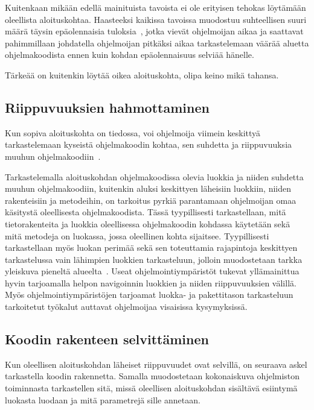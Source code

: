 \documentclass[finnish]{tktltiki2}
\theoremstyle{definition}
\theoremstyle{remark}
\begin{document}
Kuitenkaan mikään edellä mainituista tavoista ei ole erityisen tehokas löytämään oleellista aloituskohtaa. Haasteeksi kaikissa tavoissa muodostuu suhteellisen suuri määrä täysin epäolennaisia tuloksia~\cite{eliciting-design-requirements-for-maintenance-oriented-ides}, jotka vievät ohjelmoijan aikaa ja saattavat pahimmillaan johdatella ohjelmoijan pitkäksi aikaa tarkastelemaan väärää aluetta ohjelmakoodista ennen kuin kohdan epäolennaisuus selviää hänelle.

Tärkeää on kuitenkin löytää oikea aloituskohta, olipa keino mikä tahansa.


\subsection{Riippuvuuksien hahmottaminen}
Kun sopiva aloituskohta on tiedossa, voi ohjelmoija viimein keskittyä tarkastelemaan kyseistä ohjelmakoodin kohtaa, sen suhdetta ja riippuvuuksia muuhun ohjelmakoodiin~\cite{questions-during-software-evolution-tasks}.

Tarkastelemalla aloituskohdan ohjelmakoodissa olevia luokkia ja niiden suhdetta muuhun ohjelmakoodiin, kuitenkin aluksi keskittyen läheisiin luokkiin, niiden rakenteisiin ja metodeihin, on tarkoitus pyrkiä parantamaan ohjelmoijan omaa käsitystä oleellisesta ohjelmakoodista. Tässä tyypillisesti tarkastellaan, mitä tietorakenteita ja luokkia oleellisessa ohjelmakoodin kohdassa käytetään sekä mitä metodeja on luokassa, jossa oleellinen kohta sijaitsee. Tyypillisesti tarkastellaan myös luokan perimää sekä sen toteuttamia rajapintoja keskittyen tarkastelussa vain lähimpien luokkien tarkasteluun, jolloin muodostetaan tarkka yleiskuva pieneltä alueelta~\cite{questions-during-software-evolution-tasks}.
Useat ohjelmointiympäristöt tukevat yllämainittua hyvin tarjoamalla helpon navigoinnin luokkien ja niiden riippuvuuksien välillä. Myös ohjelmointiympäristöjen tarjoamat luokka- ja pakettitason tarkasteluun tarkoitetut työkalut auttavat ohjelmoijaa visaisissa kysymyksissä.

\subsection{Koodin rakenteen selvittäminen}
Kun oleellisen aloituskohdan läheiset riippuvuudet ovat selvillä, on seuraava askel tarkastella koodin rakennetta. Samalla muodostetaan kokonaiskuva ohjelmiston toiminnasta tarkastellen sitä, missä oleellisen aloituskohdan sisältävä esiintymä luokasta luodaan ja mitä parametrejä sille annetaan.
\end{document}
